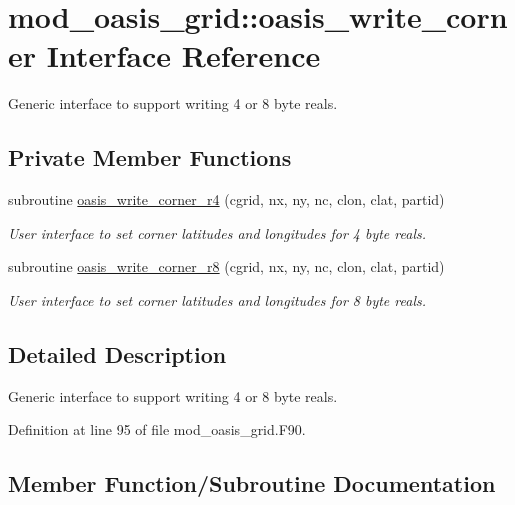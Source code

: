 \hypertarget{interfacemod__oasis__grid_1_1oasis__write__corner}{}\section{mod\+\_\+oasis\+\_\+grid\+:\+:oasis\+\_\+write\+\_\+corner Interface Reference}
\label{interfacemod__oasis__grid_1_1oasis__write__corner}


Generic interface to support writing 4 or 8 byte reals.  


\subsection*{Private Member Functions}
\begin{DoxyCompactItemize}
\item 
subroutine \hyperlink{interfacemod__oasis__grid_1_1oasis__write__corner_acb0520c68b0c2c954efc30818d2fc35e}{oasis\+\_\+write\+\_\+corner\+\_\+r4} (cgrid, nx, ny, nc, clon, clat, partid)
\begin{DoxyCompactList}\small\item\em User interface to set corner latitudes and longitudes for 4 byte reals. \end{DoxyCompactList}\item 
subroutine \hyperlink{interfacemod__oasis__grid_1_1oasis__write__corner_a441287a06e48050d2891f65497b756a0}{oasis\+\_\+write\+\_\+corner\+\_\+r8} (cgrid, nx, ny, nc, clon, clat, partid)
\begin{DoxyCompactList}\small\item\em User interface to set corner latitudes and longitudes for 8 byte reals. \end{DoxyCompactList}\end{DoxyCompactItemize}


\subsection{Detailed Description}
Generic interface to support writing 4 or 8 byte reals. 

Definition at line 95 of file mod\+\_\+oasis\+\_\+grid.\+F90.



\subsection{Member Function/\+Subroutine Documentation}
\mbox{\label{interfacemod__oasis__grid_1_1oasis__write__corner_acb0520c68b0c2c954efc30818d2fc35e}} 
